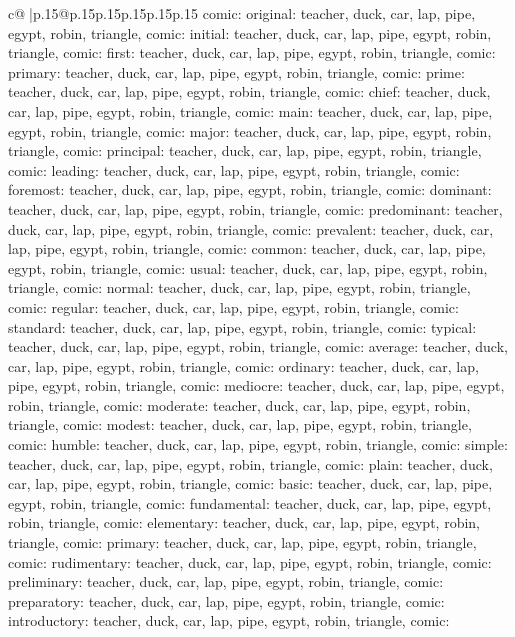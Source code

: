 \documentclass{article}
\begin{document}
{\begin{supertabular}{c@{$\;$}|p{.15\linewidth}@{}p{.15\linewidth}p{.15\linewidth}p{.15\linewidth}p{.15\linewidth}p{.15\linewidth}}
{{{comic\n\nCLUE: original\nTARGETS: teacher, duck, car, lap, pipe, egypt, robin, triangle, comic\n\nCLUE: initial\nTARGETS: teacher, duck, car, lap, pipe, egypt, robin, triangle, comic\n\nCLUE: first\nTARGETS: teacher, duck, car, lap, pipe, egypt, robin, triangle, comic\n\nCLUE: primary\nTARGETS: teacher, duck, car, lap, pipe, egypt, robin, triangle, comic\n\nCLUE: prime\nTARGETS: teacher, duck, car, lap, pipe, egypt, robin, triangle, comic\n\nCLUE: chief\nTARGETS: teacher, duck, car, lap, pipe, egypt, robin, triangle, comic\n\nCLUE: main\nTARGETS: teacher, duck, car, lap, pipe, egypt, robin, triangle, comic\n\nCLUE: major\nTARGETS: teacher, duck, car, lap, pipe, egypt, robin, triangle, comic\n\nCLUE: principal\nTARGETS: teacher, duck, car, lap, pipe, egypt, robin, triangle, comic\n\nCLUE: leading\nTARGETS: teacher, duck, car, lap, pipe, egypt, robin, triangle, comic\n\nCLUE: foremost\nTARGETS: teacher, duck, car, lap, pipe, egypt, robin, triangle, comic\n\nCLUE: dominant\nTARGETS: teacher, duck, car, lap, pipe, egypt, robin, triangle, comic\n\nCLUE: predominant\nTARGETS: teacher, duck, car, lap, pipe, egypt, robin, triangle, comic\n\nCLUE: prevalent\nTARGETS: teacher, duck, car, lap, pipe, egypt, robin, triangle, comic\n\nCLUE: common\nTARGETS: teacher, duck, car, lap, pipe, egypt, robin, triangle, comic\n\nCLUE: usual\nTARGETS: teacher, duck, car, lap, pipe, egypt, robin, triangle, comic\n\nCLUE: normal\nTARGETS: teacher, duck, car, lap, pipe, egypt, robin, triangle, comic\n\nCLUE: regular\nTARGETS: teacher, duck, car, lap, pipe, egypt, robin, triangle, comic\n\nCLUE: standard\nTARGETS: teacher, duck, car, lap, pipe, egypt, robin, triangle, comic\n\nCLUE: typical\nTARGETS: teacher, duck, car, lap, pipe, egypt, robin, triangle, comic\n\nCLUE: average\nTARGETS: teacher, duck, car, lap, pipe, egypt, robin, triangle, comic\n\nCLUE: ordinary\nTARGETS: teacher, duck, car, lap, pipe, egypt, robin, triangle, comic\n\nCLUE: mediocre\nTARGETS: teacher, duck, car, lap, pipe, egypt, robin, triangle, comic\n\nCLUE: moderate\nTARGETS: teacher, duck, car, lap, pipe, egypt, robin, triangle, comic\n\nCLUE: modest\nTARGETS: teacher, duck, car, lap, pipe, egypt, robin, triangle, comic\n\nCLUE: humble\nTARGETS: teacher, duck, car, lap, pipe, egypt, robin, triangle, comic\n\nCLUE: simple\nTARGETS: teacher, duck, car, lap, pipe, egypt, robin, triangle, comic\n\nCLUE: plain\nTARGETS: teacher, duck, car, lap, pipe, egypt, robin, triangle, comic\n\nCLUE: basic\nTARGETS: teacher, duck, car, lap, pipe, egypt, robin, triangle, comic\n\nCLUE: fundamental\nTARGETS: teacher, duck, car, lap, pipe, egypt, robin, triangle, comic\n\nCLUE: elementary\nTARGETS: teacher, duck, car, lap, pipe, egypt, robin, triangle, comic\n\nCLUE: primary\nTARGETS: teacher, duck, car, lap, pipe, egypt, robin, triangle, comic\n\nCLUE: rudimentary\nTARGETS: teacher, duck, car, lap, pipe, egypt, robin, triangle, comic\n\nCLUE: preliminary\nTARGETS: teacher, duck, car, lap, pipe, egypt, robin, triangle, comic\n\nCLUE: preparatory\nTARGETS: teacher, duck, car, lap, pipe, egypt, robin, triangle, comic\n\nCLUE: introductory\nTARGETS: teacher, duck, car, lap, pipe, egypt, robin, triangle, comic\n\nCLUE: }}}
\end{supertabular}}
\end{document}
